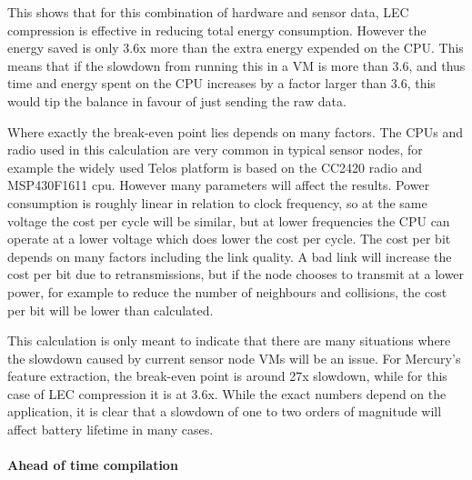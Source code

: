 This shows that for this combination of hardware and sensor data, LEC compression is effective in reducing total energy consumption. However the energy saved is only 3.6x more than the extra energy expended on the CPU. This means that if the slowdown from running this in a VM is more than 3.6, and thus time and energy spent on the CPU increases by a factor larger than 3.6, this would tip the balance in favour of just sending the raw data.

Where exactly the break-even point lies depends on many factors. The CPUs and radio used in this calculation are very common in typical sensor nodes, for example the widely used Telos platform \cite{Polastre:2005ut} is based on the CC2420 radio and MSP430F1611 cpu. However many parameters will affect the results. Power consumption is roughly linear in relation to clock frequency, so at the same voltage the cost per cycle will be similar, but at lower frequencies the CPU can operate at a lower voltage which does lower the cost per cycle. The cost per bit depends on many factors including the link quality. A bad link will increase the cost per bit due to retransmissions, but if the node chooses to transmit at a lower power, for example to reduce the number of neighbours and collisions, the cost per bit will be lower than calculated.

This calculation is only meant to indicate that there are many situations where the slowdown caused by current sensor node VMs will be an issue. For Mercury's feature extraction, the break-even point is around 27x slowdown, while for this case of LEC compression it is at 3.6x. While the exact numbers depend on the application, it is clear that a slowdown of one to two orders of magnitude will affect battery lifetime in many cases.

\paragraph{Ahead of time compilation}

